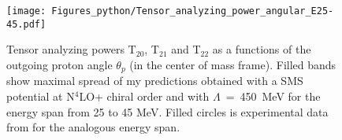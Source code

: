     \begin{figure}[h]
        \begin{center}
        \texttt{[image: Figures\_python/Tensor\_analyzing\_power\_angular\_E25-45.pdf]}
        \end{center}
        \caption{Tensor analyzing powers T$_{20}$, T$_{21}$ and T$_{22}$ as a functions of the
        outgoing proton angle $\theta_p$ (in the center of mass frame).
        Filled bands show maximal spread of my predictions obtained with a 
        SMS potential at N$^4$LO+ chiral order and with $\Lambda$~=~450~MeV
        for the energy span from 25 to 45 MeV. Filled circles is experimental data
        from \cite{rachek2007} for the analogous energy span.}
        \label{tensor_angular_25-45}
    \end{figure}
        